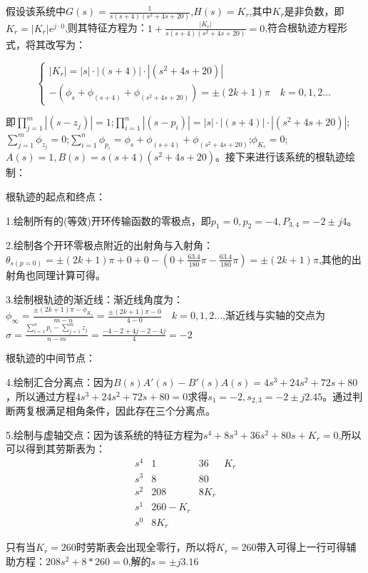 \documentclass{article}
\numberwithin{equation}{section}
\numberwithin{figure}{section}
\begin{document}
假设该系统中$G(s)=\frac{1}{s(s+4)(s^2+4s+20)}$,$H(s)=K_r$,其中$K_r$是非负数，即$K_r=|K_r|e^{j·0}$,则其特征方程为：$1+\frac{|K_r|}{s(s+4)(s^2+4s+20)}=0$,符合根轨迹方程形式，将其改写为：

\begin{equation}
    \begin{cases}
       |K_r|=|s|·|(s+4)|·|(s^2+4s+20)|\\
       -(\phi_s+\phi_{(s+4)}+\phi_{(s^2+4s+20)})=±(2k+1)\pi \quad k=0,1,2...
    \end{cases}
\end{equation}

即$\prod_{j=1}^{m}|(s-z_j)|=1$;\quad$\prod_{i=1}^{n}|(s-p_i)|=|s|·|(s+4)|·|(s^2+4s+20)|$;\quad$\sum_{j=1}^{m}\phi_{z_j}=0$;\quad$\sum_{i=1}^{n}\phi_{p_i}=\phi_s+\phi_{(s+4)}+\phi_{(s^2+4s+20)}$;\quad$\phi_{K_r}=0$;$A(s)=1,B(s)=s(s+4)(s^2+4s+20)$。接下来进行该系统的根轨迹绘制：

根轨迹的起点和终点：

1.绘制所有的(等效)开环传输函数的零极点，即$p_1=0,p_2=-4,P_{3,4}=-2±j4$。

2.绘制各个开环零极点附近的出射角与入射角：$\theta_{s(p=0)}=\pm (2k+1)\pi +0 +0-(0+\frac{63.4}{180}\pi-\frac{63.4}{180}\pi)=\pm (2k+1)\pi$,其他的出射角也同理计算可得。

3.绘制根轨迹的渐近线：渐近线角度为：$\phi_\infty = \frac{±(2k+1)\pi - \phi_{K_r}}{m-n}=\frac{±(2k+1)\pi - 0}{4-0} \quad k=0,1,2...$,渐近线与实轴的交点为$\sigma =\frac{\sum_{i=1}^{n}p_i-\sum_{j=1}^{m}z_j}{n-m}= \frac{-4-2+4j-2-4j}{4}=-2$

根轨迹的中间节点：

4.绘制汇合分离点：因为$B(s)A'(s)-B'(s)A(s)=4s^3+24s^2+72s+80$，所以通过方程$4s^3+24s^2+72s+80=0$求得$s_1=-2,s_{2,3}=-2±j2.45$。通过判断两复根满足相角条件，因此存在三个分离点。

5.绘制与虚轴交点：因为该系统的特征方程为$s^4+8s^3+36s^2+80s+K_r=0$,所以可以得到其劳斯表为：
\begin{equation}
    \begin{matrix}
        s^4&1&36&K_r\\
        s^3&8&80\\
        s^2&208&8K_r\\
        s^1&260-K_r\\
        s^0&8K_r
    \end{matrix}
\end{equation}

只有当$K_r=260$时劳斯表会出现全零行，所以将$K_r=260$带入可得上一行可得辅助方程：$208s^2+8*260=0$,解的$s=±j3.16$
\end{document}
